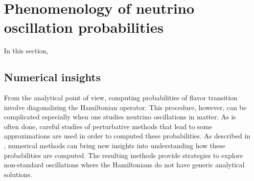 \documentclass[twocolumn,secnumarabic,amssymb, nobibnotes, aps, prd,10pt]{revtex4-1}
\begin{document}
\section{Phenomenology of neutrino oscillation probabilities}
\label{sec:pheno}

In this section, 


\subsection{Numerical insights}
\label{subsec:numerical}

From the analytical point of view, computing probabilities of flavor transition involve
diagonalizing the Hamiltonian operator. This procedure, however, can be complicated especially
when one studies neutrino oscillations in matter. As is often done, careful studies of
perturbative methods that lead to some approximations are used in order to computed these
probabilities. As described in \cite{}, numerical methods can bring new insights into 
understanding how these probabilities are computed. The resulting methods provide strategies
to explore non-standard oscillations where the Hamiltonians do not have generic analytical
solutions. 
\end{document}
